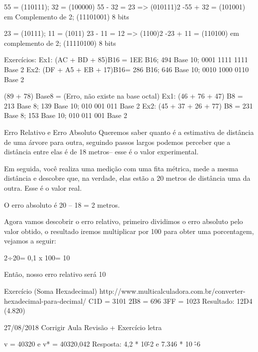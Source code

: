  55 = (110111); 32 = (100000)
 55 - 32 = 23 => (010111)2
-55 + 32 = (101001) em Complemento de 2; (11101001) 8 bits

 23 = (10111); 11 = (1011)
 23 - 11 = 12 => (1100)2
-23 + 11 = (110100) em complemento de 2; (11110100) 8 bits

Exercícios:
Ex1: (AC + BD + 85)B16 = 1EE B16; 494 Base 10; 0001 1111 1111 Base 2
Ex2: (DF + A5 + EB + 17)B16= 286 B16; 646 Base 10; 0010 1000 0110 Base 2

(89 + 78) Base8 = (Erro, não existe na base octal)
Ex1: (46 + 76 + 47) B8 = 213 Base 8; 139 Base 10; 010 001 011 Base 2
Ex2: (45 + 37 + 26 + 77) B8 = 231 Base 8; 153 Base 10; 010 011 001 Base 2


Erro Relativo e Erro Absoluto
Queremos saber quanto é a estimativa de distância de uma árvore para outra, seguindo passos largos podemos perceber que a distância entre elas é de 18 metros– esse é o valor experimental.

Em seguida, você realiza uma medição com uma fita métrica, mede a mesma distância e descobre que, na verdade, elas estão a 20 metros de distância uma da outra. Esse é o valor real.

O erro absoluto é 20 – 18 = 2 metros.

Agora vamos descobrir o erro relativo, primeiro dividimos o erro absoluto pelo valor obtido, o resultado iremos multiplicar por 100 para obter uma porcentagem, vejamos a seguir:

2÷20= 0,1 x 100= 10%

Então, nosso erro relativo será 10%

Exercício (Soma Hexadecimal)
http://www.multicalculadora.com.br/converter-hexadecimal-para-decimal/
C1D = 3101
2B8 = 696
3FF = 1023
Resultado: 12D4 (4.820)

27/08/2018
Corrigir Aula Revisão + Exercício letra 

v = 40320 e v* = 40320,042
Resposta: 4,2 * 10\^ -2 e 7.346 * 10 \^ -6



